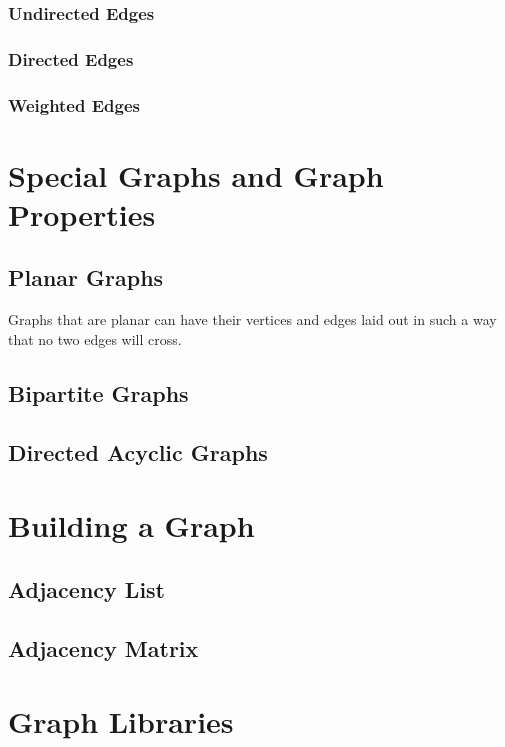 \documentclass[10pt,a4paper]{book}
\begin{document}
\subsubsection{Undirected Edges}

\subsubsection{Directed Edges}

\subsubsection{Weighted Edges}


\section{Special Graphs and Graph Properties}

\subsection{Planar Graphs}
Graphs that are planar can have their vertices and edges laid out in such a way that no two edges will cross.



\subsection{Bipartite Graphs}

\subsection{Directed Acyclic Graphs}


\section{Building a Graph}

\subsection{Adjacency List}
\subsection{Adjacency Matrix}

\section{Graph Libraries}
\end{document}
